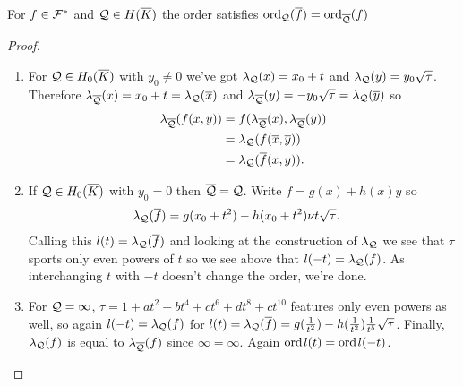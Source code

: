 \documentclass[english,11pt,a4paper]{article}
\begin{document}
\begin{lemma}\label{three}
  For $f \in \mathcal{F}^*$ and $\mathcal{Q} \in H(\overline K)$ the order satisfies $\text{ord}_{\mathcal{Q}}(\overline f) = \text{ord}_{\overline {\mathcal{Q}}} (f)$
  \begin{proof}\hfill
    \begin{enumerate}[1.]
    	\item For $\mathcal{Q} \in H_0(\overline K)$ with $y_0 \neq 0$ we've got $\lambda_{\mathcal{Q}}(x) = x_0 + t$ and $\lambda_{\mathcal{Q}}(y) = y_0 \sqrt \tau$. Therefore $\lambda_{\overline {\mathcal{Q}}}(x) = x_0 + t = \lambda_{\mathcal{Q}} (\overline x)$ and $\lambda_{\overline {\mathcal{Q}}}(y) = - y_0 \sqrt \tau = \lambda_{\mathcal{Q}} (\overline y)$ so
    	\begin{align*}
    	  \lambda_{\overline {\mathcal{Q}}} (f(x,y)) &= f(\lambda_{\overline {\mathcal{Q}}}(x) , \lambda_{\overline {\mathcal{Q}}}(y) ) \\
    	  							&= \lambda_{\mathcal{Q}} (f(\overline x, \overline y)) \\
    	  							&= \lambda_{\mathcal{Q}} (\overline f (x,y)).
    	\end{align*}

    	\item If $\mathcal{Q} \in H_0(\overline K)$ with $y_0 = 0$ then $\overline {\mathcal{Q}} = \mathcal{Q}$. Write $f = g(x) + h(x)y$ so
    	\begin{align*}
    	  \lambda_{\mathcal{Q}} (\overline f) &= g(x_0 + t^2) - h(x_0 + t^2) \nu t \sqrt{\tau}.
    	\end{align*}
    	Calling this $l(t) = \lambda_{\mathcal{Q}} (\overline f)$ and looking at the construction of $\lambda_{\mathcal{Q}}$ we see that $\tau$ sports only even powers of $t$ so we see above that $l(-t) = \lambda_{\mathcal{Q}} (f)$. As interchanging $t$ with $-t$ doesn't change the order, we're done.

    	\item For $\mathcal{Q} = \infty$, $\tau = 1 + a t^2 + b t^4 + c t^6 + d t^8 + c t^{10}$ features only even powers as well, so again $l(-t) = \lambda_{\mathcal{Q}} (f)$ for $l(t) = \lambda_{\mathcal{Q}} (\overline f) = g(\frac{1}{t^2}) - h(\frac{1}{t^2}) \frac{1}{t^5} \sqrt{\tau}$. Finally, $\lambda_{\mathcal{Q}} (f)$ is equal to $\lambda_{\overline {\mathcal{Q}}} (f)$ since $\infty = \bar \infty$. Again $\text{ord\hspace{0.4mm}} l(t) = \text{ord\hspace{0.4mm}} l(-t)$.
    \end{enumerate}
  \end{proof}
\end{lemma}
\end{document}
